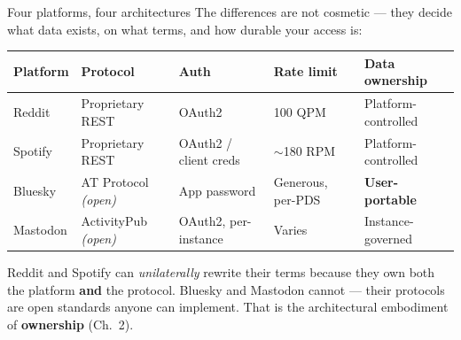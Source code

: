\documentclass[9pt,aspectratio=169]{beamer}
\begin{document}
\begin{frame}{Four platforms, four architectures}
    The differences are not cosmetic --- they decide what data exists, on what terms, and how durable your access is:
    \vspace{0.6em}

    \centering
    \footnotesize
    \begin{tabular}{@{}lllll@{}}
        \toprule
        \textbf{Platform} & \textbf{Protocol} & \textbf{Auth} & \textbf{Rate limit} & \textbf{Data ownership}\\
        \midrule
        Reddit   & Proprietary REST & OAuth2                & 100 QPM            & Platform-controlled\\
        Spotify  & Proprietary REST & OAuth2 / client creds & $\sim$180 RPM      & Platform-controlled\\
        Bluesky  & AT Protocol \textit{(open)}  & App password  & Generous, per-PDS  & \textbf{User-portable}\\
        Mastodon & ActivityPub \textit{(open)}  & OAuth2, per-instance & Varies      & Instance-governed\\
        \bottomrule
    \end{tabular}

    \vspace{0.9em}
    \raggedright
    Reddit and Spotify can \textit{unilaterally} rewrite their terms because they own both the platform \textbf{and} the protocol. Bluesky and Mastodon cannot --- their protocols are open standards anyone can implement. That is the architectural embodiment of \textbf{ownership} (Ch.~2).
\end{frame}
\end{document}
